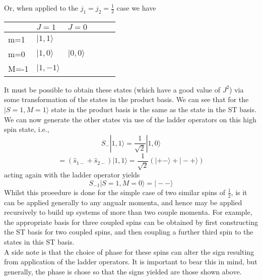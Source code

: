 \documentclass[12pt]{article}
\begin{document}
Or, when applied to the $j_{1} = j_{2} = \frac{1}{2}$ case we have
\begin{table}[]
\begin{tabular}{@{}llllll@{}}
\hline
\multicolumn{1}{l||}{}     &   \multicolumn{1}{l|}{$J= 1 $} & \multicolumn{1}{l}{$J=0$} \\
\hline\hline
\multicolumn{1}{l||}{m=1}  &    \multicolumn{1}{l|}{$|1,1\rangle $} & \multicolumn{1}{l}{}              \\
\multicolumn{1}{l||}{m=0}  &    \multicolumn{1}{l|}{$|1,0\rangle $} & \multicolumn{1}{l}{$|0,0\rangle $}  \\
\multicolumn{1}{l||}{M=-1} &     \multicolumn{1}{l|}{$|1,-1\rangle$} & \multicolumn{1}{l}{}              \\
\end{tabular}
\end{table}
It must be possible to obtain these states (which have a good value of $J^{2}$)
via some transformation of the states in the product basis. We can see that for
the $|S=1,M=1\rangle$ state in the product basis is the same as the state in
the ST basis. We can now generate the other states via use of the ladder
operators on this high spin state, i.e.,
\begin{equation*}
\hat{S}_{-} | 1,1\rangle = \frac{1}{\sqrt{2}}|1,0\rangle 
\end{equation*}
\begin{equation*}
= (\hat{s}_{1-}+\hat{s}_{2-}) | 1,1\rangle = \frac{1}{\sqrt{2}}(|+-\rangle + |-+\rangle)
\end{equation*}
acting again with the ladder operator yields
\begin{equation}
S_{-1}|S=1,M=0\rangle  = |--\rangle
\end{equation}
Whilst this proeedure is done for the simple case of two similar spins of $\frac{1}{2}$, is it can
be applied generally to any angualr momenta, and hence may be applied recursively to build up
systems of more than two couple momenta. For example, the appropriate basis for three coupled spins can be 
obtained by first constructing the ST basis for two coupled spins, and then coupling a further third
spin to the states in this ST basis.\\

\noindent A side note is that the choice of phase for these spins can alter the sign resulting 
from application of the ladder operators. It is important to bear this in mind, but generally, the
phase is chose so that the signs yielded are those shown above.\\
\end{document}
